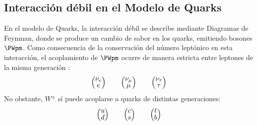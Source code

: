 \subsection{Interacción débil en el Modelo de Quarks}\label{sec:weak_int_quarks}
En el modelo de Quarks, la interacción débil se describe mediante Diagramas de Feynman, donde se produce un cambio de sabor en los quarks, emitiendo bosones $\PWpm$. Como consecuencia de la conservación del número leptónico en esta interacción, el acoplamiento de $\PWpm$ ocurre de manera estricta entre leptones de la misma generación \cite{Griffiths2008}: 
\begin{align}
\begingroup 
\renewcommand*{\arraystretch}{0.8}
\setlength\arraycolsep{10pt}
\begin{pmatrix} \nu _{e} \\ e \end{pmatrix} \qquad
\begin{pmatrix} \nu_{\mu } \\ \mu \end{pmatrix} \qquad
\begin{pmatrix} \nu_{\tau} \\ \tau \end{pmatrix}
\endgroup
\end{align}
No obstante, $W^{\pm}$ sí puede acoplarse a quarks de distintas generaciones:
\begin{align}
\begingroup 
\renewcommand*{\arraystretch}{0.8}
\setlength\arraycolsep{10pt}
\begin{pmatrix} u \\ d \end{pmatrix} \qquad
\begin{pmatrix} c \\ s \end{pmatrix} \qquad
\begin{pmatrix} t \\ b \end{pmatrix}
\endgroup
\end{align}

